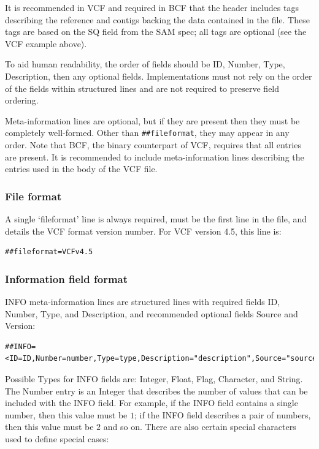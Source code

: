 \documentclass[8pt]{article}
\begin{document}
It is recommended in VCF and required in BCF that the header includes tags describing the reference and contigs backing the data contained in the file.
These tags are based on the SQ field from the SAM spec; all tags are optional (see the VCF example above).

To aid human readability, the order of fields should be ID, Number, Type, Description, then any optional fields.
Implementations must not rely on the order of the fields within structured lines and are not required to preserve field ordering.

Meta-information lines are optional, but if they are present then they must be completely well-formed.
Other than \verb|##fileformat|, they may appear in any order.
Note that BCF, the binary counterpart of VCF, requires that all entries are present.
It is recommended to include meta-information lines describing the entries used in the body of the VCF file.


\subsubsection{File format}
A single `fileformat' line is always required, must be the first line in the file, and details the VCF format version number.
For VCF version 4.5, this line is:

\begin{verbatim}
##fileformat=VCFv4.5
\end{verbatim}


\subsubsection{Information field format}
INFO meta-information lines are structured lines with required fields ID, Number, Type, and Description, and recommended optional fields Source and Version:

\begin{verbatim}
##INFO=<ID=ID,Number=number,Type=type,Description="description",Source="source",Version="version">
\end{verbatim}

Possible Types for INFO fields are: Integer, Float, Flag, Character, and String.
The Number entry is an Integer that describes the number of values that can be included with the INFO field.
For example, if the INFO field contains a single number, then this value must be $1$; if the INFO field describes a pair of numbers, then this value must be $2$ and so on.
There are also certain special characters used to define special cases:
\end{document}

